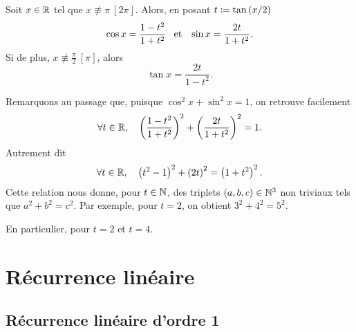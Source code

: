 \documentclass{magnolia}
\begin{document}
\begin{proposition}[utile=-3]
Soit $x\in\mathbb{R}$ tel que $x\not\equiv \pi\ [2\pi]$. Alors, en posant $t\coloneqq\tan\left(x/2\right)$
\[\cos x=\frac{1-t^2}{1+t^2} \quad\!\text{et}\quad\! \sin x=\frac{2t}{1+t^2}.\]
Si de plus, $x\not\equiv\frac{\pi}{2}\ [\pi]$, alors
\[\tan x=\frac{2t}{1-t^2}.\]
\end{proposition}

\begin{remarqueUnique}
\remarque Remarquons au passage que, puisque $\cos^2 x+\sin^2 x=1$, on retrouve facilement
  \[\forall t\in\mathbb{R} ,\quad \left(\frac{1-t^2}{1+t^2}\right)^2+\left(\frac{2t}{1+t^2}\right)^2=1.\]
  Autrement dit
  \[\forall t\in\mathbb{R} ,\quad \left(t^2-1\right)^2+\left(2t\right)^2=\left(1+t^2\right)^2.\]
  Cette relation nous donne, pour $t\in\mathbb{N}$, des triplets $\left(a,b,c\right)\in\mathbb{N}^3$ non triviaux tels que $a^2+b^2=c^2$. Par exemple, pour $t=2$, on obtient $3^2+4^2=5^2$.
  \begin{sol}
  En particulier, pour $t=2$ et $t=4$.
  \end{sol}
\end{remarqueUnique}


\section{Récurrence linéaire}

 \subsection{Récurrence linéaire d'ordre 1}
\end{document}
